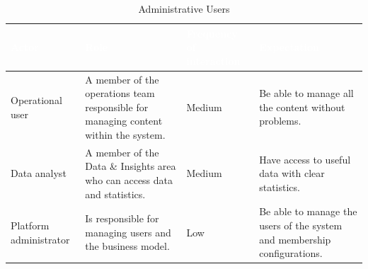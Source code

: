 \documentclass{article}
\begin{document}
\begin{table}[H]

\centering

\small

\renewcommand{\arraystretch}{1.35}

\caption{Administrative Users}

\label{tab:administrative_users}

\begin{tabularx}{\textwidth}{|p{2.8cm}|X|p{2.8cm}|X|}

\hline

\rowcolor[HTML]{1F2937}

\textcolor{white}{\textbf{Actor}} &
\textcolor{white}{\textbf{Role}} &
\textcolor{white}{\textbf{Frequency of interaction}} &
\textcolor{white}{\textbf{Expectation}} \\

\hline

Operational user
&
A member of the operations team responsible for managing content within the system.
&
Medium
&
Be able to manage all the content without problems.

\\

\hline

Data analyst
&
A member of the Data \& Insights area who can access data and statistics.
&
Medium
&
Have access to useful data with clear statistics.

\\

\hline

Platform administrator
&
Is responsible for managing users and the business model.
&
Low
&
Be able to manage the users of the system and membership configurations.

\\

\hline

\end{tabularx}

\end{table}
\end{document}
